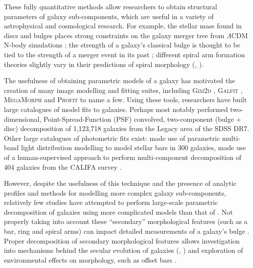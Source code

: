 \documentclass[../main.tex]{subfiles}
\begin{document}


These fully quantitative methods allow researchers to obtain structural parameters of galaxy sub-components, which are useful in a variety of astrophysical and cosmological research. For example, the stellar mass found in discs and bulges places strong constraints on the galaxy merger tree from $\Lambda\mathrm{CDM}$ N-body simulations \citep{Hopkins2010:1004.2708v3}; the strength of a galaxy's classical bulge is thought to be tied to the strength of a merger event in its past \citep{Kormendy2010:1009.3015v1}; different spiral arm formation theories slightly vary in their predictions of spiral morphology (\citealt{Dobbs2014:1407.5062v1}, \citealt{Pour-Imani2016:1608.00969v1} \citealt{2017MNRAS.472.2263H}).

The usefulness of obtaining parametric models of a galaxy has motivated the creation of many image modelling and fitting suites, including \textsc{Gim2d} \citep{gim2d-paper}, \textsc{Galfit} \citep{galfit-paper}, \textsc{MegaMorph} \citep{megamorph-paper} and \textsc{Profit} \citep{profit-paper} to name a few. Using these tools, researchers have built large catalogues of model fits to galaxies. Perhaps most notably \citet{Simard2002:astro-ph/0205025v2} performed two-dimensional, Point-Spread-Function (PSF) convolved, two-component (bulge + disc) decomposition of 1,123,718 galaxies from the Legacy area of the SDSS DR7. Other large catalogues of photometric fits exist: \cite{Gadotti2010:1003.1719v2} made use of parametric multi-band light distribution modelling to model stellar bars in 300 galaxies, \cite{Mendez-Abreu2016:1610.05324v1} made use of a human-supervised approach to perform multi-component decomposition of 404 galaxies from the CALIFA survey \citep{Sanchez2011:1111.0962v2}.

However, despite the usefulness of this technique and the presence of analytic profiles and methods for modelling more complex galaxy sub-components, relatively few studies have attempted to perform large-scale parametric decomposition of galaxies using more complicated models than that of \citet{Simard2002:astro-ph/0205025v2}. Not properly taking into account these ``secondary'' morphological features (such as a bar, ring and spiral arms) can impact detailed measurements of a galaxy's bulge \citep{Gao2017:1709.00746v1}. Proper decomposition of secondary morphological features allows investigation into mechanisms behind the secular evolution of galaxies (\citealt{2018MNRAS.473.4731K}, \citealt{2018ApJ...862..100G}) and exploration of environmental effects on morphology, such as offset bars \citep{2017MNRAS.469.3363K}.
\end{document}
